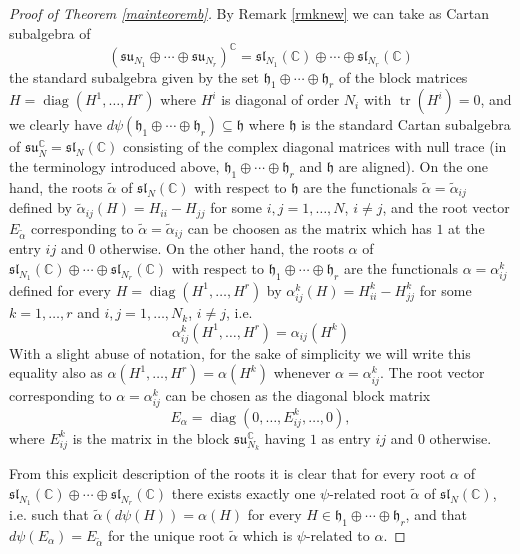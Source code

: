 \documentclass[reqno]{amsart}
\newcommand{\C}{\mathds{C}}
\newcommand{\tr}{\operatorname{tr}}
\newcommand{\diag}{\operatorname{diag}}
\begin{document}
\begin{proof}[Proof of Theorem \ref{mainteoremb}]
By Remark \ref{rmknew}
we can take as Cartan subalgebra of 
$$(\mathfrak{su}_{N_1} \oplus  \cdots \oplus \mathfrak{su}_{N_r} )^{\C} = \mathfrak{sl}_{N_1}(\C) \oplus  \cdots \oplus \mathfrak{sl}_{N_r}(\C)$$ the standard subalgebra given by   the set $\mathfrak{h}_1 \oplus \cdots \oplus \mathfrak{h}_r$ of the block matrices $H = \diag(H^1, \dots, H^r)$ where $H^i$ is diagonal of order $N_i$ with $\tr(H^i)=0$, and we clearly have $d \psi(\mathfrak{h}_1 \oplus \cdots \oplus \mathfrak{h}_r) \subseteq \mathfrak{h}$ where $\mathfrak{h}$ is the standard Cartan subalgebra of $\mathfrak{su}_{N}^{\C} = \mathfrak{sl}_{N}(\C)$ consisting of the complex diagonal matrices with null trace (in the terminology introduced above, $\mathfrak{h}_1 \oplus \cdots \oplus \mathfrak{h}_r$ and $\mathfrak{h}$ are aligned).
On the one hand, the roots $\tilde \alpha$ of $\mathfrak{sl}_{N}(\C)$ with respect to $\mathfrak{h}$ are the functionals $\tilde \alpha = \tilde \alpha_{ij}$ defined by $\tilde \alpha_{ij}(H) = H_{ii} - H_{jj}$ for some $i, j = 1, \dots, N$, $i \neq j$, and the root vector $E_{\tilde \alpha}$ corresponding to $\tilde \alpha = \tilde \alpha_{ij}$ can be choosen as  the matrix which has $1$ at the entry $ij$ and $0$ otherwise.
On the other hand, the roots $\alpha$ of $\mathfrak{sl}_{N_1}(\C) \oplus  \cdots \oplus \mathfrak{sl}_{N_r}(\C)$ with respect to $\mathfrak{h}_1 \oplus \cdots \oplus \mathfrak{h}_r$  are the functionals $\alpha = \alpha^k_{ij}$ defined for every $H = \diag(H^1, \dots, H^r)$ by $\alpha^k_{ij}(H) = H^k_{ii} - H^k_{jj}$ for some $k = 1, \dots, r$ and $i,j = 1, \dots, N_k$, $i \neq j$, i.e.
\begin{equation}\label{H1Hk}
\alpha^k_{ij}(H^1, \dots, H^r) = \alpha_{ij}(H^k)
\end{equation}
With a slight abuse of notation, for the sake of simplicity we will write this equality also as $\alpha(H^1, \dots, H^r) = \alpha(H^k)$ whenever $\alpha = \alpha^k_{ij}$.
The root vector corresponding to $\alpha = \alpha^k_{ij}$ can be chosen as the diagonal block matrix 
$$E_{\alpha} = \diag(0, \dots, E_{ij}^k, \dots, 0),$$
where $E_{ij}^k$ is the matrix in the block $\mathfrak{su}_{N_k}^{\C}$ having $1$ as entry $ij$ and $0$ otherwise.

From this explicit description of the roots it is clear that for every root $\alpha$ of $\mathfrak{sl}_{N_1}(\C) \oplus  \cdots \oplus \mathfrak{sl}_{N_r}(\C)$ there exists exactly one $\psi$-related root $\tilde \alpha$ of $\mathfrak{sl}_{N}(\C)$, i.e. such that $\tilde \alpha(d \psi(H)) = \alpha(H)$ for every $H \in \mathfrak{h}_1 \oplus \cdots \oplus \mathfrak{h}_r$, and that $d \psi(E_{\alpha}) = E_{\tilde \alpha}$ for the unique root $\tilde \alpha$ which is $\psi$-related to $\alpha$.



\end{proof}
\end{document}

